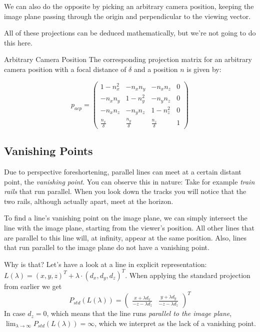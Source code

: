 \documentclass{panikzettel}
\begin{document}
We can also do the opposite by picking an arbitrary camera position, keeping the image plane passing through the origin and perpendicular to the viewing vector.

All of these projections can be deduced mathematically, but we're not going to do this here.

\begin{defi}{Arbitrary Camera Position}
The corresponding projection matrix for an arbitrary camera position with a focal distance of $\delta$ and a position $n$ is given by:

$$p_{acp} =
\begin{pmatrix}
1-n_x^2 & -n_xn_y & -n_xn_z & 0 \\
-n_xn_y & 1-n_y^2 & -n_yn_z & 0 \\
-n_xn_z & -n_yn_z & 1-n_z^2 & 0 \\
\frac{n_x}{\delta} & \frac{n_y}{\delta} & \frac{n_z}{\delta} & 1
\end{pmatrix}$$
\end{defi}

\subsection{Vanishing Points}
Due to perspective foreshortening, parallel lines can meet at a certain distant point, the \emph{vanishing point}. You can observe this in nature: Take for example \emph{train rails} that run parallel. When you look down the tracks you will notice that the two rails, although actually apart, meet at the horizon.

To find a line's vanishing point on the image plane, we can simply intersect the line with the image plane, starting from the viewer's position. All other lines that are parallel to this line will, at infinity, appear at the same position. Also, lines that run parallel to the image plane do not have a vanishing point.

Why is that? Let's have a look at a line in explicit representation: $L(\lambda) = (x, y, z)^T + \lambda \cdot (d_x, d_y, d_z)^T$. When applying the standard projection from earlier we get $$P_{std} (L(\lambda)) = \begin{pmatrix} \frac{x + \lambda d_x}{-z - \lambda d_z} & \frac{y + \lambda d_y}{-z  - \lambda d_z} \end{pmatrix}^T$$
In case $d_z = 0$, which means that the line runs \emph{parallel to the image plane}, $\lim_{\lambda \to \infty} P_{std} (L(\lambda)) = \infty$, which we interpret as the lack of a vanishing point.
\end{document}
